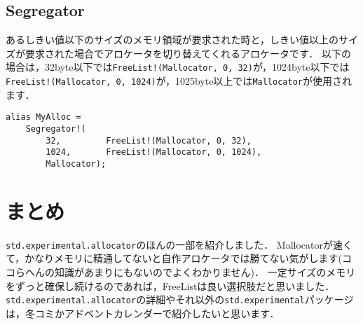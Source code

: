 \subsection{Segregator}

あるしきい値以下のサイズのメモリ領域が要求された時と，しきい値以上のサイズが要求された場合でアロケータを切り替えてくれるアロケータです．
以下の場合は，32byte以下では\texttt{FreeList!(Mallocator,\ 0,\ 32)}が，1024byte以下では\texttt{FreeList!(Mallocator,\ 0,\ 1024)}が，1025byte以上では\texttt{Mallocator}が使用されます．

\begin{lstlisting}
alias MyAlloc =
    Segregator!(
        32,         FreeList!(Mallocator, 0, 32),
        1024,       FreeList!(Mallocator, 0, 1024),
        Mallocator);
\end{lstlisting}

\section{まとめ}

\texttt{std.experimental.allocator}のほんの一部を紹介しました．
Mallocatorが速くて，かなりメモリに精通してないと自作アロケータでは勝てない気がします(ココらへんの知識があまりにもないのでよくわかりません)．
一定サイズのメモリをずっと確保し続けるのであれば，FreeListは良い選択肢だと思いました．
\texttt{std.experimental.allocator}の詳細やそれ以外の\texttt{std.experimental}パッケージは，冬コミかアドベントカレンダーで紹介したいと思います．
